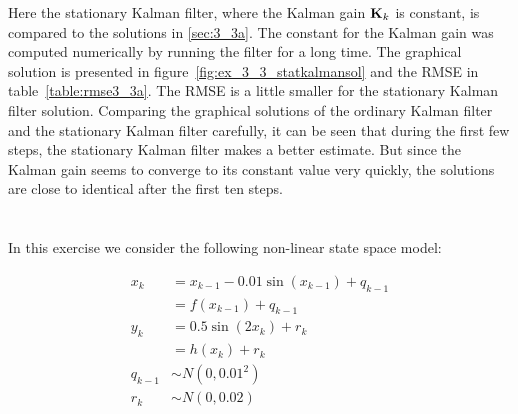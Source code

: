 \documentclass[a4paper,oneside,article]{memoir}
\begin{document}
Here the stationary Kalman filter, where the Kalman gain $\mathbf{K}_k$ is constant,
is compared to the solutions in \ref{sec:3_3a}. The constant for the Kalman gain
was computed numerically by running the filter for a long time. The graphical
solution is presented in figure~\ref{fig:ex_3_3_statkalmansol} and the RMSE in
table~\ref{table:rmse3_3a}. The RMSE is a little smaller for the stationary
Kalman filter solution. Comparing the graphical solutions of the
ordinary Kalman filter and the stationary Kalman filter carefully, it can be
seen that during the first few steps, the stationary Kalman filter makes a
better estimate. But since the Kalman gain seems to converge to its constant
value very quickly, the solutions are close to identical after the first ten
steps.




\begin{table}[h]
	\centering
	
	\label{table:rmse3_3a}
\end{table}

\clearpage



\section{}
\subsection{}\label{sec:4_1}
In this exercise we consider the following non-linear state space model:

\begin{align}
	x_k&=x_{k-1}-0.01\sin(x_{k-1})+q_{k-1}\\
	&=f(x_{k-1})+q_{k-1}\\
	y_k&=0.5\sin(2x_k)+r_k\\
	&=h(x_{k})+r_{k}\\
	q_{k-1} &\sim N\left(0,0.01^2\right)\\
	r_{k} &\sim N\left(0,0.02 \right)
\end{align}
\end{document}
